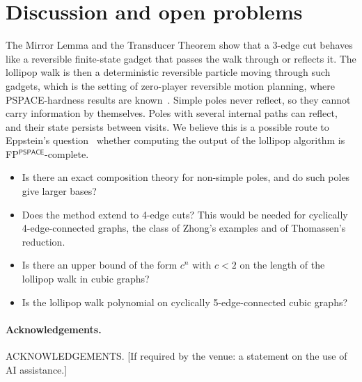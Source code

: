 \documentclass[11pt]{article}
\theoremstyle{definition}
\begin{document}
\section{Discussion and open problems}\label{sec:discussion}

The Mirror Lemma and the Transducer Theorem show that a 3-edge cut behaves like a reversible
finite-state gadget that passes the walk through or reflects it. The lollipop walk is then a
deterministic reversible particle moving through such gadgets, which is the setting of zero-player
reversible motion planning, where PSPACE-hardness results are known~\cite{DHHL22}. Simple poles
never reflect, so they cannot carry information by themselves. Poles with several internal paths
can reflect, and their state persists between visits. We believe this is a possible route to
Eppstein's question~\cite{Eppstein23} whether computing the output of the lollipop algorithm is
FP$^{\textsf{PSPACE}}$-complete.

\begin{itemize}
\item Is there an exact composition theory for non-simple poles, and do such poles give larger
bases?
\item Does the method extend to 4-edge cuts? This would be needed for cyclically 4-edge-connected
graphs, the class of Zhong's examples and of Thomassen's reduction.
\item Is there an upper bound of the form $c^n$ with $c < 2$ on the length of the lollipop walk in
cubic graphs?
\item Is the lollipop walk polynomial on cyclically 5-edge-connected cubic graphs?
\end{itemize}

\paragraph{Acknowledgements.} ACKNOWLEDGEMENTS. [If required by the venue: a statement on the use
of AI assistance.]
\end{document}
